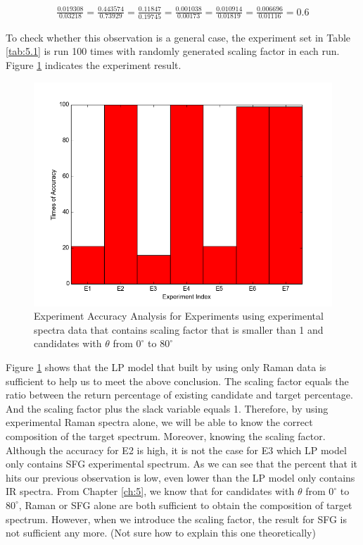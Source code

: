 \begin{eqnarray} \label{eqn:6.3}
\frac{0.019308}{0.03218} = \frac{0.443574}{0.73929} = \frac{0.11847}{0.19745} =\frac{0.001038}{0.00173}  = \frac{0.010914}{0.01819} = \frac{0.006696}{0.01116} = 0.6
\end{eqnarray}

To check whether this observation is a general case, the experiment set in Table \ref{tab:5.1} is run 100 times with randomly generated scaling factor in each run. Figure \ref{fig:6.3} indicates the experiment result. \\

\begin{figure}[!ht] 
\centering
\includegraphics[scale=0.4]{Figures/chapter6_1.png}
\caption{Experiment Accuracy Analysis for Experiments using experimental spectra data that contains scaling factor that is smaller than 1 and candidates with $\theta$ from $0^{\circ}$ to $80^{\circ}$}
\label{fig:6.3}
\end{figure}


Figure \ref{fig:6.3} shows that the LP model that built by using only Raman data is sufficient to help us to meet the above conclusion. The scaling factor equals the ratio between the return percentage of existing candidate and target percentage. And the scaling factor plus the slack variable equals 1. Therefore, by using experimental Raman spectra alone, we will be able to know the correct composition of the target spectrum. Moreover, knowing the scaling factor. \\
Although the accuracy for E2 is high, it is not the case for E3 which LP model only contains SFG experimental spectrum. As we can see that the percent that it hits our previous observation is low, even lower than the LP model only contains IR spectra. From Chapter \ref{ch:5}, we know that for candidates with $\theta$ from $0^{\circ}$ to $80^{\circ}$, Raman or SFG alone are both sufficient to obtain the composition of target spectrum. However, when we introduce the scaling factor, the result for SFG is not sufficient any more. (Not sure how to explain this one theoretically)\\

